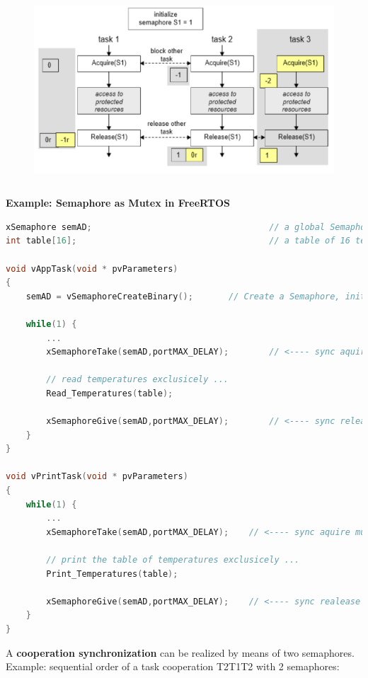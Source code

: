  	\begin{figure}[h]
    \centering
    \includegraphics[width=14cm, height=7cm]{Images/image106.png}
    \label{fig:Fig 52}
    \end{figure}


\textbf{Example: Semaphore as Mutex in FreeRTOS}

\begin{lstlisting}[style=mystyle, language=c]
xSemaphore semAD;									// a global Semaphore
int table[16];										// a table of 16 temperatures

void vAppTask(void * pvParameters)
{
	semAD = vSemaphoreCreateBinary();		// Create a Semaphore, initially 1 

	while(1) {
		...
		xSemaphoreTake(semAD,portMAX_DELAY);		// <---- sync aquire mutex
		
		// read temperatures exclusicely ...
		Read_Temperatures(table);

		xSemaphoreGive(semAD,portMAX_DELAY);		// <---- sync release the mutex
 	}
}

void vPrintTask(void * pvParameters)
{
	while(1) {
		...
		xSemaphoreTake(semAD,portMAX_DELAY);	// <---- sync aquire mutex
		
		// print the table of temperatures exclusicely ...
		Print_Temperatures(table);

		xSemaphoreGive(semAD,portMAX_DELAY);	// <---- sync realease the mutex !
 	}
}
\end{lstlisting}

A \textbf{cooperation synchronization} can be realized by means of two semaphores. Example: sequential order of a task cooperation T2T1T2 with 2 semaphores:


